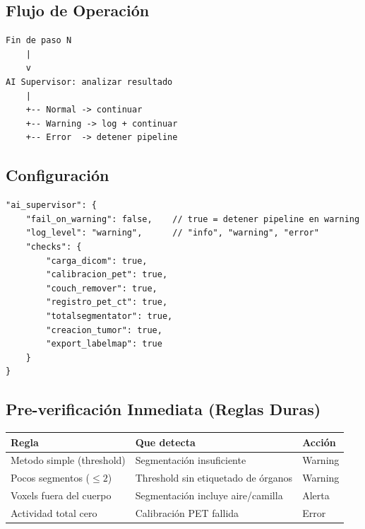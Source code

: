 \documentclass[12pt,a4paper]{article}
\begin{document}
\subsection{Flujo de Operación}

\begin{lstlisting}
Fin de paso N
    |
    v
AI Supervisor: analizar resultado
    |
    +-- Normal -> continuar
    +-- Warning -> log + continuar
    +-- Error  -> detener pipeline
\end{lstlisting}

\subsection{Configuración}

\begin{lstlisting}
"ai_supervisor": {
    "fail_on_warning": false,    // true = detener pipeline en warning
    "log_level": "warning",      // "info", "warning", "error"
    "checks": {
        "carga_dicom": true,
        "calibracion_pet": true,
        "couch_remover": true,
        "registro_pet_ct": true,
        "totalsegmentator": true,
        "creacion_tumor": true,
        "export_labelmap": true
    }
}
\end{lstlisting}

\subsection{Pre-verificación Inmediata (Reglas Duras)}

\begin{table}[H]
\centering
\begin{tabular}{l l l}
\toprule
\textbf{Regla} & \textbf{Que detecta} & \textbf{Acción} \\
\midrule
Metodo simple (threshold) & Segmentación insuficiente & Warning \\
Pocos segmentos ($\leq 2$) & Threshold sin etiquetado de órganos & Warning \\
Voxels fuera del cuerpo & Segmentación incluye aire/camilla & Alerta \\
Actividad total cero & Calibración PET fallida & Error \\
\bottomrule
\end{tabular}
\end{table}
\end{document}
